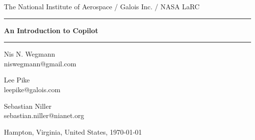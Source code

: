 \documentclass[]{article}
\theoremstyle{example}
\newcommand{\HRule}{\rule{\linewidth}{0.25pt}}
\begin{document}
\thispagestyle{empty}

\begin{center}

The National Institute of Aerospace / Galois Inc. / NASA LaRC

\vspace{0.1cm}

\HRule

\vspace{0.6cm}

{\Huge \bfseries
An Introduction to Copilot
}
\HRule

\vspace{0.6cm}

\begin{minipage}{0.3\textwidth}
\large
\begin{center}
Nis N. Wegmann\\
\small{
niswegmann@gmail.com\\
}
\end{center}
\end{minipage}
\begin{minipage}{0.3\textwidth}
\large
\begin{center}
Lee Pike\\
\small{
leepike@galois.com\\
}
\end{center}
\end{minipage}
\begin{minipage}{0.3\textwidth}
\large
\begin{center}
Sebastian Niller\\
\small{
sebastian.niller@nianet.org\\
}
\end{center}
\end{minipage}

\vspace{1cm}

{\large
Hampton, Virginia, United States, \today
}


\let\thefootnote\relax{}

\end{center}
\end{document}
